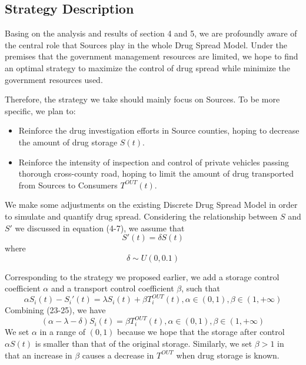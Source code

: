 \subsection{Strategy Description}
Basing on the analysis and results of section 4 and 5, we are profoundly aware of the central role that Sources play in the whole Drug Spread Model. Under the premises that the government management resources are limited, we hope to find an optimal strategy to maximize the control of drug spread while minimize the government resources used. 

Therefore, the strategy we take should mainly focus on Sources. To be more specific, we plan to:
\begin{itemize}
	\item Reinforce the drug investigation efforts in Source counties, hoping to decrease the amount of drug storage $S(t)$.
	\item Reinforce the intensity of inspection and control of private vehicles passing thorough cross-county road, hoping to limit the amount of drug transported from Sources to Consumers $T^{OUT}(t)$.
\end{itemize}

We make some adjustments on the existing Discrete Drug Spread Model in order to simulate and quantify drug spread. Considering the relationship between $S$ and $S'$ we discussed in equation (4-7), we assume that 
\begin{equation}
S'(t) = \delta S(t)
\end{equation}
where
\begin{equation}
\delta \sim U(0, 0.1)
\end{equation}

Corresponding to the strategy we proposed earlier, we add a storage control coefficient $\alpha$ and a transport control coefficient $\beta$, such that
\begin{equation}
\alpha S_i(t) - S_i'(t) = \lambda S_i(t) + \beta T_i^{OUT}(t), \alpha\in (0,1), \beta \in (1, +\infty)
\end{equation}
Combining (23-25), we have
\begin{equation}
(\alpha - \lambda - \delta)S_i(t) = \beta T_i^{OUT}(t), \alpha\in (0,1), \beta \in (1, +\infty)
\end{equation}
We set $\alpha$ in a range of $(0,1)$ because we hope that the storage after control $\alpha S(t)$ is smaller than that of the original storage. Similarly, we set $\beta > 1$ in that an increase in $\beta$ causes a decrease in $T^{OUT}$ when drug storage is known.

